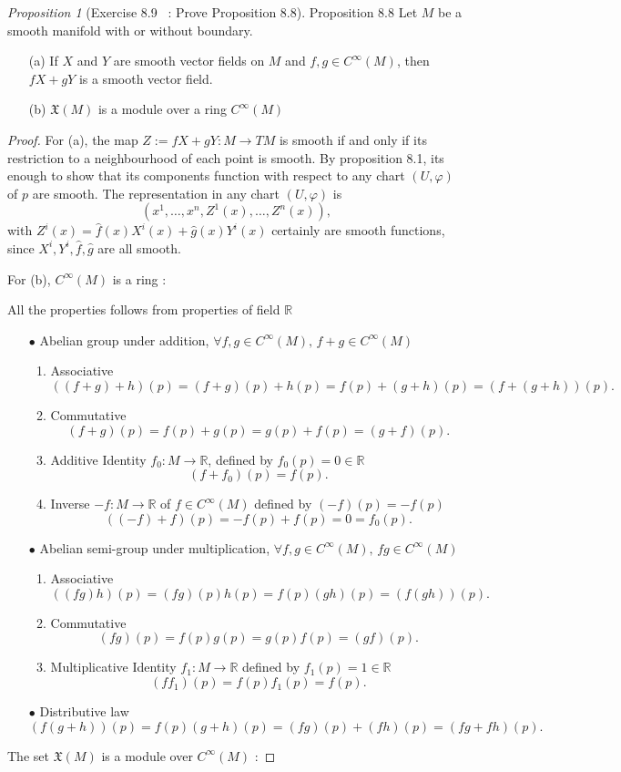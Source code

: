 \documentclass[a4paper]{article}
\theoremstyle{remark}
\newtheorem{prop}{Proposition}
\newcommand{\er}{\mathbb{R}} %
\newcommand{\CM}{C^{\infty}(M)} %
\begin{document}
\begin{prop}[Exercise 8.9 \cite{LeeSM} \, : Prove Proposition 8.8]
Proposition 8.8 Let $M$ be a smooth manifold with or without boundary.
\begin{enumerate}
\item[(a)] If $X$ and $Y$ are smooth vector fields on $M$ and $f,g \in \CM$, then $fX+gY$ is a smooth vector field. 
\item[(b)] $\mathfrak{X}(M)$ is a module over a ring $\CM$
\end{enumerate}
\end{prop}
\begin{proof}
For (a), the map $Z :=fX+gY : M \to TM$ is smooth if and only if its restriction to a neighbourhood of each point is smooth. By proposition 8.1, its enough to show that its components function with respect to any chart $(U,\varphi)$ of $p$ are smooth. The representation in any chart $(U,\varphi)$ is
$$
(x^1,\dots,x^n,Z^1(x),\dots,Z^n(x)),
$$
with $Z^i(x) = \hat{f}(x)X^i(x)+\hat{g}(x)Y^i(x)$ certainly are smooth functions, since $X^i, Y^i,\hat{f},\hat{g}$ are all smooth. 

For (b), $\CM$ is a ring :

All the properties follows from properties of field $\er$
\begin{enumerate}
\item[$\bullet $] Abelian group under addition, $\forall f,g \in \CM, \, f+g \in \CM$
\begin{enumerate}[nolistsep]
\item Associative 
$$((f+g)+h)(p) = (f+g)(p)+ h(p) = f(p) + (g+h)(p) = (f+(g+h))(p).$$
\item Commutative 
$$(f+g)(p)=f(p) + g(p) = g(p) +f(p) = (g+f)(p).$$
\item Additive Identity $f_0 : M \to \er$, defined by  $f_0(p) = 0 \in \er$
$$(f+f_0)(p) = f(p).$$
\item Inverse $-f : M \to \er$ of $f \in \CM$ defined by $(-f)(p) = -f(p)$
$$
((-f) + f)(p) = -f(p) + f(p) = 0 = f_0(p).
$$
\end{enumerate}
\item[$\bullet $] Abelian semi-group under multiplication, $\forall f,g \in \CM, \, fg \in \CM$
\begin{enumerate}[nolistsep]
\item Associative
$$((fg)h)(p) = (fg)(p) h(p) = f(p)(gh)(p) = (f(gh))(p).$$
\item Commutative
$$(fg)(p) = f(p)g(p) = g(p)f(p) = (gf)(p). $$
\item Multiplicative Identity $f_1 : M \to \er$ defined by $f_1(p)=1 \in \er$
$$(ff_1)(p) = f(p)f_1(p) = f(p). $$
\end{enumerate}
\item[$\bullet $] Distributive law
$$
(f(g+h)) (p) = f(p) (g+h)(p) = (fg)(p) + (fh)(p) = (fg + fh)(p).
$$
\end{enumerate}
The set $\mathfrak{X}(M)$ is a module over $\CM$ : 


\end{proof}
\end{document}
